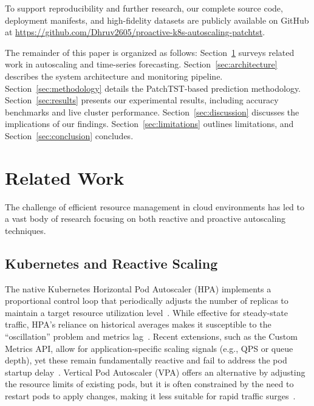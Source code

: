 \documentclass[conference]{IEEEtran}
\begin{document}
To support reproducibility and further research, our complete source code, deployment manifests, and high-fidelity datasets are publicly available on GitHub at \url{https://github.com/Dhruv2605/proactive-k8s-autoscaling-patchtst}.

The remainder of this paper is organized as follows: Section~\ref{sec:related} surveys related work in autoscaling and time-series forecasting. Section~\ref{sec:architecture} describes the system architecture and monitoring pipeline. Section~\ref{sec:methodology} details the PatchTST-based prediction methodology. Section~\ref{sec:results} presents our experimental results, including accuracy benchmarks and live cluster performance. Section~\ref{sec:discussion} discusses the implications of our findings. Section~\ref{sec:limitations} outlines limitations, and Section~\ref{sec:conclusion} concludes.

\section{Related Work}\label{sec:related}

The challenge of efficient resource management in cloud environments has led to a vast body of research focusing on both reactive and proactive autoscaling techniques.

\subsection{Kubernetes and Reactive Scaling}
The native Kubernetes Horizontal Pod Autoscaler (HPA) implements a proportional control loop that periodically adjusts the number of replicas to maintain a target resource utilization level~\cite{k8s_hpa}. While effective for steady-state traffic, HPA's reliance on historical averages makes it susceptible to the ``oscillation'' problem and metrics lag~\cite{lorido2014review}. Recent extensions, such as the Custom Metrics API, allow for application-specific scaling signals (e.g., QPS or queue depth), yet these remain fundamentally reactive and fail to address the pod startup delay~\cite{baarzi2021showar}. Vertical Pod Autoscaler (VPA) offers an alternative by adjusting the resource limits of existing pods, but it is often constrained by the need to restart pods to apply changes, making it less suitable for rapid traffic surges~\cite{rzadca2020autopilot}.
\end{document}
